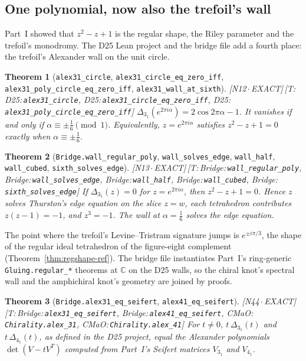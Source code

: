 \documentclass[11pt]{article}
\newtheorem{theorem}{Theorem}
\theoremstyle{definition}
\newcommand{\lean}[1]{\texttt{\small #1}}
\newcommand{\dtag}[1]{#1}
\begin{document}
\subsection{One polynomial, now also the trefoil's wall}
Part~I showed that $z^2-z+1$ is the regular shape, the Riley parameter and the trefoil's monodromy. The D25 Lean project and the bridge file add a fourth place: the trefoil's Alexander wall on the unit circle.
\begin{theorem}[\lean{alex31\_circle}, \lean{alex31\_circle\_eq\_zero\_iff}, \lean{alex31\_poly\_circle\_eq\_zero\_iff}, \lean{alex31\_wall\_at\_sixth}]\dtag{\textsf{\small[N12\,$\cdot$\,EXACT]}\,\textsf{\small[T:\,D25:\,\lean{alex31\_\allowbreak{}circle}, D25:\,\lean{alex31\_\allowbreak{}circle\_\allowbreak{}eq\_\allowbreak{}zero\_\allowbreak{}iff}, D25:\,\lean{alex31\_\allowbreak{}poly\_\allowbreak{}circle\_\allowbreak{}eq\_\allowbreak{}zero\_\allowbreak{}iff}]}}
$\Delta_{3_1}(e^{2\pi i\alpha})=2\cos2\pi\alpha-1$. It vanishes if and only if $\alpha\equiv\pm\tfrac16\pmod1$. Equivalently, $z=e^{2\pi i\alpha}$ satisfies $z^2-z+1=0$ exactly when $\alpha\equiv\pm\tfrac16$.
\end{theorem}
\begin{theorem}[\lean{Bridge.wall\_regular\_poly}, \lean{wall\_solves\_edge}, \lean{wall\_half}, \lean{wall\_cubed}, \lean{sixth\_solves\_edge}]\dtag{\textsf{\small[N13\,$\cdot$\,EXACT]}\,\textsf{\small[T:\,Bridge:\,\lean{wall\_\allowbreak{}regular\_\allowbreak{}poly}, Bridge:\,\lean{wall\_\allowbreak{}solves\_\allowbreak{}edge}, Bridge:\,\lean{wall\_\allowbreak{}half}, Bridge:\,\lean{wall\_\allowbreak{}cubed}, Bridge:\,\lean{sixth\_\allowbreak{}solves\_\allowbreak{}edge}]}}
If $\Delta_{3_1}(z)=0$ for $z=e^{2\pi i\alpha}$, then $z^2-z+1=0$. Hence $z$ solves Thurston's edge equation on the slice $z=w$, each tetrahedron contributes $z(z-1)=-1$, and $z^3=-1$. The wall at $\alpha=\tfrac16$ solves the edge equation.
\end{theorem}
The point where the trefoil's Levine--Tristram signature jumps is $e^{\pm i\pi/3}$, the shape of the regular ideal tetrahedron of the figure-eight complement (Theorem~\ref{thm:regshape-ref}). The bridge file instantiates Part~I's ring-generic \lean{Gluing.regular\_*} theorems at $\mathbb C$ on the D25 walls, so the chiral knot's spectral wall and the amphichiral knot's geometry are joined by proofs.
\begin{theorem}[\lean{Bridge.alex31\_eq\_seifert}, \lean{alex41\_eq\_seifert}]\dtag{\textsf{\small[N44\,$\cdot$\,EXACT]}\,\textsf{\small[T:\,Bridge:\,\lean{alex31\_\allowbreak{}eq\_\allowbreak{}seifert}, Bridge:\,\lean{alex41\_\allowbreak{}eq\_\allowbreak{}seifert}, CMaO:\,\lean{Chirality.\allowbreak{}alex\_\allowbreak{}31}, CMaO:\,\lean{Chirality.\allowbreak{}alex\_\allowbreak{}41}]}}
For $t\neq0$, $t\,\Delta_{3_1}(t)$ and $t\,\Delta_{4_1}(t)$, as defined in the D25 project, equal the Alexander polynomials $\det(V-tV^T)$ computed from Part~I's Seifert matrices $V_{3_1}$ and $V_{4_1}$.
\end{theorem}
\end{document}
